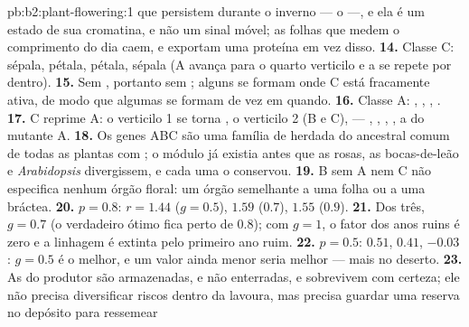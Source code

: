 \begin{solution}{pb:b2:plant-flowering:1}
que persistem durante o inverno --- o  ---, e ela é um estado
de sua cromatina, e não um sinal móvel; as folhas que medem o
comprimento do dia caem, e exportam uma proteína em vez disso.
\textbf{14.} Classe C: sépala, pétala, pétala, sépala (A avança para o quarto
verticilo e a  se repete por dentro).
\textbf{15.} Sem , portanto sem ; alguns  se formam
onde C está fracamente ativa, de modo que algumas  se formam de
vez em quando.
\textbf{16.} Classe A: , , , .
\textbf{17.} C reprime A: o verticilo 1 se torna , o verticilo 2
(B e C),  --- , , , , a  do mutante
A.
\textbf{18.} Os genes ABC são uma família de 
herdada do ancestral comum de todas as plantas com ; o módulo já
existia antes que as rosas, as bocas-de-leão e \emph{Arabidopsis}
divergissem, e cada uma o conservou.
\textbf{19.} B sem A nem C não especifica nenhum órgão floral: um órgão
semelhante a uma folha ou a uma bráctea.
\textbf{20.} $p = 0.8$: $r = 1.44$ ($g = 0.5$), $1.59$ ($0.7$), $1.55$
($0.9$).
\textbf{21.} Dos três, $g = 0.7$ (o verdadeiro ótimo fica perto de
$0.8$); com $g = 1$, o fator dos anos ruins é zero e a linhagem é
extinta pelo primeiro ano ruim.
\textbf{22.} $p = 0.5$: $0.51$, $0.41$, $-0.03$: $g = 0.5$ é o melhor,
e um valor ainda menor seria melhor --- mais  no deserto.
\textbf{23.} As  do produtor são armazenadas, e não enterradas,
e sobrevivem com certeza; ele não precisa diversificar riscos dentro da
lavoura, mas precisa guardar uma reserva no depósito para ressemear

\end{solution}
